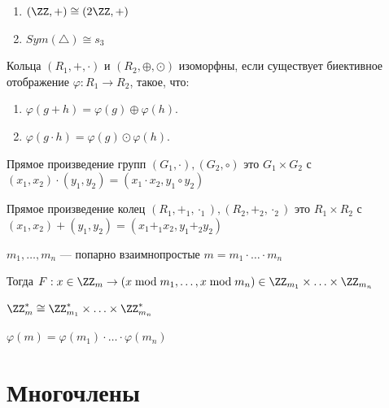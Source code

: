 \begin{example}{}{}
    \begin{enumerate}
        \item
            \( (\ZZ, +) \cong (2\ZZ, +) \)
        \item
            \( Sym(\triangle) \cong s_3 \)
    \end{enumerate}
\end{example}

\begin{defn}{}{}
    Кольца \( (R_1, +, \cdot) \) и \( (R_2, \oplus, \odot) \) изоморфны,
    если существует биективное отображение \( \varphi : R_1 \to R_2 \),
    такое, что:
    \begin{enumerate}
        \item
            \( \varphi(g + h) = \varphi(g) \oplus \varphi(h) \).
        \item
            \( \varphi(g \cdot h) = \varphi(g) \odot \varphi(h) \).
    \end{enumerate}
\end{defn}

\begin{defn}{}{}
    Прямое произведение групп \( (G_1, \cdot), (G_2, \circ) \)
    это \( G_1 \times G_2 \) с \( (x_1, x_2) \cdot (y_1, y_2) = (x_1 \cdot x_2, y_1 \circ y_2) \)
\end{defn}

\begin{defn}{}{}
    Прямое произведение колец \( (R_1, +_1, \cdot_1), (R_2, +_2, \cdot_2) \)
    это \( R_1 \times R_2 \) с \( (x_1, x_2) + (y_1, y_2) = (x_1 +_1 x_2, y_1 +_2 y_2) \)
\end{defn}

\begin{thrm}{}{}
    \( m_1, \ldots, m_n \) --- попарно взаимнопростые \( m = m_1 \cdot \ldots \cdot m_n \)

    Тогда \( F : x \in \ZZ_m \to (x \bmod m_1, \ldots, x \bmod m_n) \in \ZZ_{m_1} \times \ldots \times \ZZ_{m_n} \)
\end{thrm}

\begin{coroll}{}{}
    \( \ZZ_m^* \cong \ZZ_{m_1}^* \times \ldots \times \ZZ_{m_n}^* \)

    \( \varphi(m) = \varphi(m_1) \cdot \ldots \cdot \varphi(m_n) \)
\end{coroll}

\newpage

\section{Многочлены}

